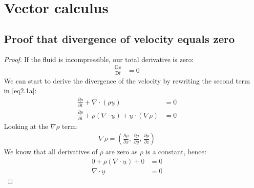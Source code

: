 \documentclass[11pt]{article}
\numberwithin{equation}{section}
\begin{document}
\section{Vector calculus}
\subsection{Proof that divergence of velocity equals zero}
\begin{proof}
If the fluid is incompressible, our total derivative is zero:
\begin{align}
    \frac{\textrm{D}\rho}{\textrm{D}t} &= 0
\end{align}
We can start to derive the divergence of the velocity by rewriting the second term in \ref{eq2.1a}:
\begin{align}
    \frac{\partial \rho}{\partial t} + \nabla \cdot \left(\rho \underline{u}\right) &= 0 \label{eq2.1a}\\ 
    \frac{\partial \rho}{\partial t} + \rho \left(\nabla \cdot \underline{u}\right) + \underline{u} \cdot \left(\nabla \rho\right) &= 0
\end{align}
Looking at the $\nabla \rho$ term:
\begin{align}
    \nabla \rho = \left(\frac{\partial \rho}{\partial x}, \, \frac{\partial \rho}{\partial y}, \, \frac{\partial \rho}{\partial z}\right)
\end{align}
We know that all derivatives of $\rho$ are zero as $\rho$ is a constant, hence:
\begin{align}
    0 + \rho \left(\nabla \cdot \underline{u}\right) + 0 &= 0\\
    \nabla \cdot \underline{u} &= 0
\end{align}
\end{proof}
\end{document}
